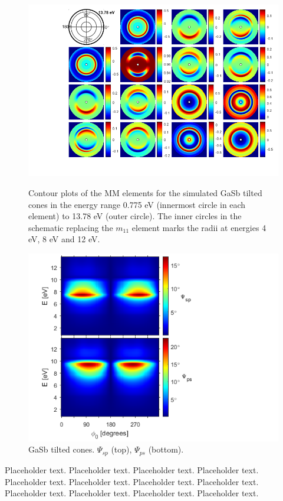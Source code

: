 \begin{figure}[h!]
    \centering
    \includegraphics[width=\linewidth, trim=2.4cm 1.6cm 0.4cm 0cm, clip]{figures/ch4/gasb/contour/GaSbCones_contour_MM_13point78eV.png}
    \label{fig:gasb_contour_MM_full}
    \caption{Contour plots of the MM elements for the simulated GaSb tilted cones in the energy range 0.775 eV (innermost circle in each element) to 13.78 eV (outer circle). The inner circles in the schematic replacing the $m_{11}$ element marks the radii at energies 4 eV, 8 eV and 12 eV.}
\end{figure}

\begin{figure}[h!]  %
    \centering
    \includegraphics[width=0.65\linewidth, trim= 0.5cm 0cm 5.1cm 0cm, clip]{figures/ch4/gasb/contour/GaSbCones_contour_Psisp_Psips(1).png}
    \caption{GaSb tilted cones. $\Psi_{sp}$ (top), $\Psi_{ps}$ (bottom).}
    \label{fig:gasb_contour_Psisp_Psips}
\end{figure} 



Placeholder text. Placeholder text. Placeholder text. Placeholder text. Placeholder text. Placeholder text. Placeholder text. Placeholder text. Placeholder text. Placeholder text. Placeholder text. Placeholder text. 
